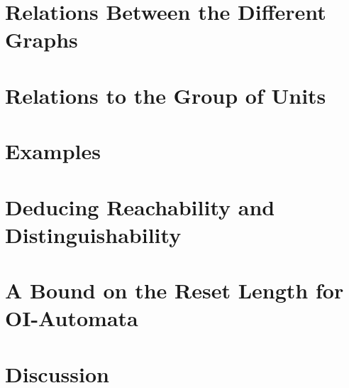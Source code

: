 

\section{Relations Between the Different Graphs}
\label{sync_max:graphs:sec:relations}



\section{Relations to the Group of Units}
\label{sync_max:graphs:sec:grpunits}



\section{Examples}
\label{sync_max:graphs:sec:examples}






\section{Deducing Reachability and Distinguishability}
\label{sync_max:graphs:sec:cr_cd}



\section{A Bound on the Reset Length for OI-Automata}
\label{sync_max:graphs:sec:extend-bound}



\section{Discussion}


